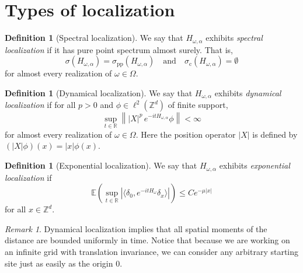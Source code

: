 \documentclass[11pt, a4paper, UKenglish, oneside]{book}
\theoremstyle{plain}
\theoremstyle{remark}
\newtheorem{remark}[theorem]{Remark}
\theoremstyle{definition}
\newtheorem{definition}[theorem]{Definition}
\numberwithin{equation}{section}
\numberwithin{theorem}{section}
\begin{document}
\section{Types of localization}

\begin{definition}[Spectral localization]
We say that $H_{\omega,\alpha}$ exhibits \textit{spectral localization} if it has pure point spectrum almost surely. That is,
\begin{equation}
    \sigma(H_{\omega,\alpha}) = \sigma_{\mathrm{pp}}(H_{\omega,\alpha}) \quad \text{and} \quad \sigma_{\mathrm{c}}(H_{\omega,\alpha}) = \emptyset    
\end{equation}
for almost every realization of $\omega \in \Omega$.
\end{definition}


\begin{definition}[Dynamical localization]
    We say that $H_{\omega,\alpha}$ exhibits \textit{dynamical localization} if for all $p>0$ and $\phi \in \ell^2(\mathbb{Z}^d)$ of finite support,
    \begin{equation}
    \sup_{t \in \mathbb{R}} \left\| |X|^p\,e^{-it H_{\omega,\alpha}}\phi \right\| < \infty \label{eq:dynloc}
    \end{equation}
    for almost every realization of $\omega \in \Omega$. Here the position operator $|X|$ is defined by $(|X|\phi)(x) = |x|\phi(x)$.
\end{definition}

\begin{definition}[Exponential localization]
    We say that $H_{\omega,\alpha}$ exhibits \textit{exponential localization} if 
    \begin{equation}
        \mathbb{E}\left( \sup_{t \in \mathbb{R}} |\langle \delta_0, e^{-itH_\omega} \delta_x \rangle |\right) \leq C e^{- \mu |x|}\label{eq:explocalisation}
    \end{equation}
    for all $x \in \mathbb{Z}^d$.
\end{definition}

\begin{remark}
Dynamical localization implies that all spatial moments of the distance are bounded uniformly in time. Notice that because we are working on an infinite grid with translation invariance, we can consider any arbitrary starting site just as easily as the origin $0$. 
\end{remark}
\end{document}
